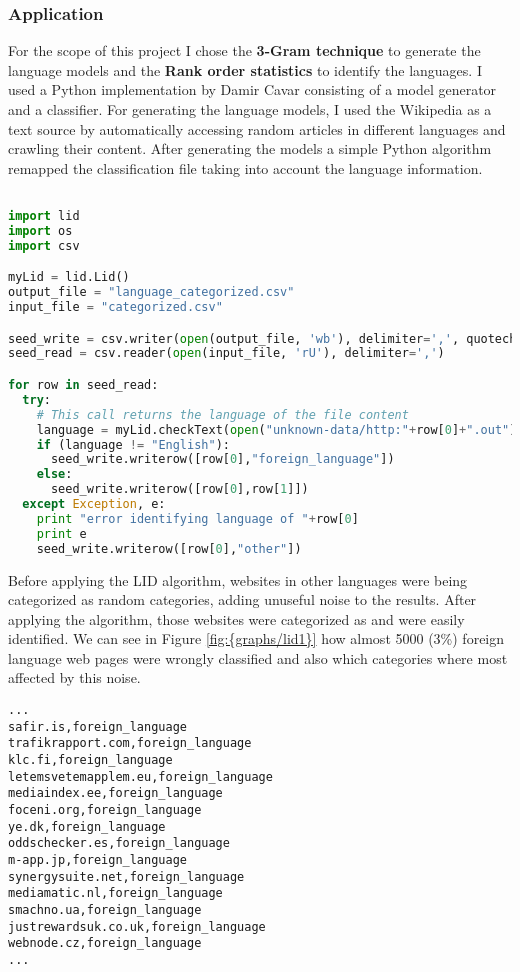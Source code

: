 \subsubsection{Application}
For the scope of this project I chose the {\bf 3-Gram technique} to generate the language models and the {\bf Rank order statistics} to identify the languages. I used a Python implementation by Damir 
Cavar\cite{lid1} consisting of a model generator and a classifier.
For generating the language models, I used the Wikipedia as a text source by automatically accessing random articles in different languages and crawling their content. 
After generating the models a simple Python algorithm remapped the classification file taking into account the language information.

\begin{lstlisting}[language=Python]

import lid
import os
import csv

myLid = lid.Lid()
output_file = "language_categorized.csv"
input_file = "categorized.csv"

seed_write = csv.writer(open(output_file, 'wb'), delimiter=',', quotechar='|', quoting=csv.QUOTE_MINIMAL)
seed_read = csv.reader(open(input_file, 'rU'), delimiter=',')

for row in seed_read:
  try:
    # This call returns the language of the file content
    language = myLid.checkText(open("unknown-data/http:"+row[0]+".out").read())
    if (language != "English"):
      seed_write.writerow([row[0],"foreign_language"])
    else:
      seed_write.writerow([row[0],row[1]])
  except Exception, e:
    print "error identifying language of "+row[0]
    print e
    seed_write.writerow([row[0],"other"])
\end{lstlisting}

Before applying the LID algorithm, websites in other languages were being categorized as random categories, adding unuseful noise to the results. After applying the algorithm, those websites were 
categorized as  and were easily identified. We can see in Figure \ref{fig:{graphs/lid1}} how almost 5000 (3\%) foreign language web pages were wrongly classified and also which
categories where most affected by this noise.


\begin{lstlisting}
...
safir.is,foreign_language
trafikrapport.com,foreign_language
klc.fi,foreign_language
letemsvetemapplem.eu,foreign_language
mediaindex.ee,foreign_language
foceni.org,foreign_language
ye.dk,foreign_language
oddschecker.es,foreign_language
m-app.jp,foreign_language
synergysuite.net,foreign_language
mediamatic.nl,foreign_language
smachno.ua,foreign_language
justrewardsuk.co.uk,foreign_language
webnode.cz,foreign_language
...
\end{lstlisting}
